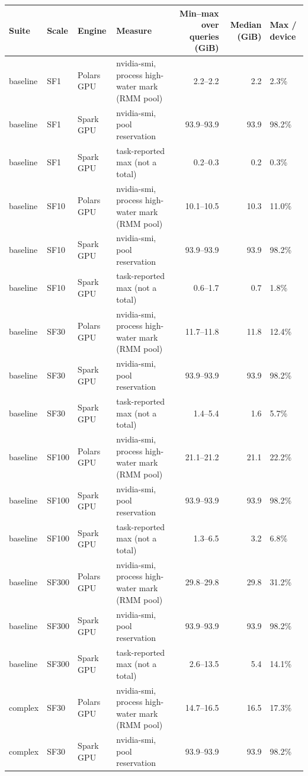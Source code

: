 \begin{tabular}{llllrrl}
\toprule
Suite & Scale & Engine & Measure & Min--max over queries (GiB) & Median (GiB) & Max / device \\
\midrule
baseline & SF1 & Polars GPU & nvidia-smi, process high-water mark (RMM pool) & 2.2--2.2 & 2.2 & 2.3\% \\
baseline & SF1 & Spark GPU & nvidia-smi, pool reservation & 93.9--93.9 & 93.9 & 98.2\% \\
baseline & SF1 & Spark GPU & task-reported max (not a total) & 0.2--0.3 & 0.2 & 0.3\% \\
baseline & SF10 & Polars GPU & nvidia-smi, process high-water mark (RMM pool) & 10.1--10.5 & 10.3 & 11.0\% \\
baseline & SF10 & Spark GPU & nvidia-smi, pool reservation & 93.9--93.9 & 93.9 & 98.2\% \\
baseline & SF10 & Spark GPU & task-reported max (not a total) & 0.6--1.7 & 0.7 & 1.8\% \\
baseline & SF30 & Polars GPU & nvidia-smi, process high-water mark (RMM pool) & 11.7--11.8 & 11.8 & 12.4\% \\
baseline & SF30 & Spark GPU & nvidia-smi, pool reservation & 93.9--93.9 & 93.9 & 98.2\% \\
baseline & SF30 & Spark GPU & task-reported max (not a total) & 1.4--5.4 & 1.6 & 5.7\% \\
baseline & SF100 & Polars GPU & nvidia-smi, process high-water mark (RMM pool) & 21.1--21.2 & 21.1 & 22.2\% \\
baseline & SF100 & Spark GPU & nvidia-smi, pool reservation & 93.9--93.9 & 93.9 & 98.2\% \\
baseline & SF100 & Spark GPU & task-reported max (not a total) & 1.3--6.5 & 3.2 & 6.8\% \\
baseline & SF300 & Polars GPU & nvidia-smi, process high-water mark (RMM pool) & 29.8--29.8 & 29.8 & 31.2\% \\
baseline & SF300 & Spark GPU & nvidia-smi, pool reservation & 93.9--93.9 & 93.9 & 98.2\% \\
baseline & SF300 & Spark GPU & task-reported max (not a total) & 2.6--13.5 & 5.4 & 14.1\% \\
complex & SF30 & Polars GPU & nvidia-smi, process high-water mark (RMM pool) & 14.7--16.5 & 16.5 & 17.3\% \\
complex & SF30 & Spark GPU & nvidia-smi, pool reservation & 93.9--93.9 & 93.9 & 98.2\% \\

\end{tabular}
